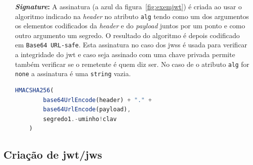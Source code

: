 \begin{itemize}
    Estes atributos registados têm todos 3 caracteres visto que um dos requisitos do \acrshort{jwt} é ser o mais pequeno/compacto possível.

    Existem depois mais dois tipos de atributos, públicos e privados. Os atributos públicos podem ser definidos à vontade pelos utilizadores de \acrshort{jwt}s mas têm de ser registados em \textit{IANA JSON Web Token Claims registry} ou definidos por um espaço de nomes resistente a colisões de forma a evitar a colisão de atributos. Já os atributos privados são aqueles que não são nem registados nem públicos e podem ser definidos à vontade pelos utilizadores de \acrshort{jwt}s. Os dois atributos usados no exemplo~\ref{exem:pay} (\texttt{name} e \texttt{num}) são atributos privados.

    \begin{lstlisting}[language=json, caption=\textit{Payload} usado para construir o \acrshort{jwt} da figura~\ref{fig:exemjwt}, label=exem:pay]
    {
        "name": "José Martins",
        "num": "a78821"
    }
    \end{lstlisting}

\item [\textbf{\textit{Signature}:}] A assinatura (a azul da figura~\ref{fig:exemjwt}) é criada ao usar o algoritmo indicado na \textit{header} no atributo \texttt{alg} tendo como um dos argumentos os elementos codificados da \textit{header} e do \textit{payload} juntos por um ponto e como outro argumento um segredo. O resultado do algoritmo é depois codificado em \texttt{Base64 URL-safe}. Esta assinatura no caso dos \acrshort{jws}s é usada para verificar a integridade do \acrshort{jwt} e caso seja assinado com uma chave privada permite também verificar se o remetente é quem diz ser. No caso de o atributo \texttt{alg} for \texttt{none} a assinatura é uma \texttt{string} vazia.

    \begin{lstlisting}[language=javascript, caption=\textit{Signature} usado para construir o \acrshort{jwt} da figura~\ref{fig:exemjwt}]
    HMACSHA256(
        base64UrlEncode(header) + "." +
        base64UrlEncode(payload),
        segredo1.-uminho!clav
    )
    \end{lstlisting}
\end{itemize}

\subsection{Criação de \acrshort{jwt}/\acrshort{jws}}\label{sec:criacaojwt}

